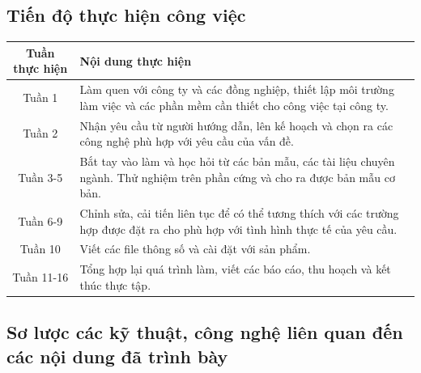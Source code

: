 \begin{flushleft}
    \subsection{Tiến độ thực hiện công việc}
    \begin{tabular}{cp{9cm}}
        \toprule
        Tuần thực hiện & Nội dung thực hiện \\
        \midrule
        Tuần 1    & Làm quen với công ty và các đồng nghiệp, thiết lập môi trường làm việc 
                    và các phần mềm cần thiết cho công việc tại công ty. \\
        \addlinespace
        Tuần 2    & Nhận yêu cầu từ người hướng dẫn, lên kế hoạch và chọn ra các công nghệ phù hợp với yêu cầu của vấn đề. \\
        \addlinespace
        Tuần 3-5    & Bắt tay vào làm và học hỏi từ các bản mẫu, các tài liệu chuyên ngành. Thử nghiệm trên phần cứng và cho ra được bản mẫu cơ bản. \\
        \addlinespace
        Tuần 6-9    & Chỉnh sửa, cải tiến liên tục để có thể tương thích với các trường hợp được đặt ra cho phù hợp với tình hình thực tế của yêu cầu. \\
        \addlinespace
        Tuần 10    & Viết các file thông số và cài đặt với sản phẩm. \\
        \addlinespace
        Tuần 11-16    & Tổng hợp lại quá trình làm, viết các báo cáo, thu hoạch và kết thúc thực tập.\\
        \bottomrule
      \end{tabular}
    \subsection{Sơ lược các kỹ thuật, công nghệ liên quan đến các nội dung đã trình bày}
\end{flushleft}